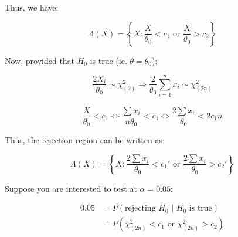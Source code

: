 \documentclass{article}
\begin{document}
Thus, we have:

\begin{equation*}
    \Lambda(X) = \left\{ X: \frac{\overline{X}}{\theta_0} < c_1 \text{ or } \frac{\overline{X}}{\theta_0} > c_2  \right\}
\end{equation*}

Now, provided that $H_0$ is true (ie. $\theta = \theta_0$):

\begin{equation*}
    \frac{2X_i}{\theta_0} \sim \chi^2_{(2)} \Rightarrow \frac{2}{\theta_0} \sum_{i=1}^n x_i \sim \chi^2_{(2n)}
\end{equation*}

\begin{equation*}
    \frac{\overline{X}}{\theta_0} < c_1 \iff \frac{\sum x_i}{n\theta_0} < c_1 \iff \frac{2\sum x_i}{\theta_0} < 2c_1 n
\end{equation*}

Thus, the rejection region can be written as:

\begin{equation*}
    \Lambda(X) = \left\{ X: \frac{2\sum x_i}{\theta_0} < c_1' \text{ or } \frac{2\sum x_i}{\theta_0} > c_2'  \right\}
\end{equation*}

Suppose you are interested to test at $\alpha = 0.05$:

\begin{equation*}
    \begin{split}
        0.05 &= P(\text{rejecting $H_0$ | $H_0$ is true})\\
        &= P\left(\chi^2_{(2n)} < c_1 \text{ or } \chi^2_{(2n)} > c_2\right)
    \end{split}
\end{equation*}
\end{document}
